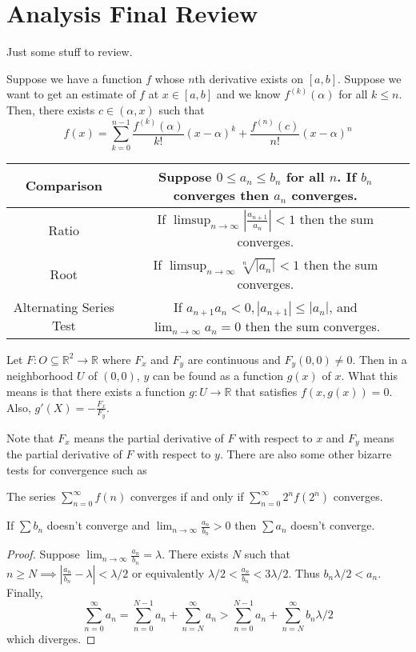 \documentclass{article}
\newcommand{\R}{\mathbb{R}}
\newcommand{\ra}[1][]{\xrightarrow{#1}}
\begin{document}
\section{Analysis Final Review}
Just some stuff to review.
\begin{theorem}
  Suppose we have a function $f$ whose $n$th derivative exists on $[a,b]$. Suppose we want to get an estimate of $f$ at $x\in[a,b]$ and we know $f^{(k)}(\alpha)$ for all $k\leq n$. Then, there exists $c\in(\alpha,x)$ such that
  $$f(x)=\sum_{k=0}^{n-1}\frac{f^{(k)}(\alpha)}{k!}(x-\alpha)^k+\frac{f^{(n)}(c)}{n!}(x-\alpha)^n$$
\end{theorem}
\begin{tabular}{|c|c|}
\hline
Comparison & Suppose $0\leq a_n\leq b_n$ for all $n$. If $b_n$ converges then $a_n$ converges. \\
\hline
Ratio & If $\limsup_{n\ra\infty}|\frac{a_{n+1}}{a_n}|<1$ then the sum converges.\\
\hline
Root & If $\limsup_{n\ra\infty}\sqrt[n]{|a_n|}<1$ then the sum converges.\\
\hline
Alternating Series Test & If $a_{n+1}a_n<0,|a_{n+1}|\leq|a_n|$, and $\lim_{n\ra\infty}a_n=0$ then the sum converges. \\
\hline
\end{tabular}
\begin{theorem}
Let $F:O\subseteq \R^2\ra\R$ where $F_x$ and $F_y$ are continuous and $F_y(0,0)\neq 0$. Then in a neighborhood $U$ of $(0,0)$, $y$ can be found as a function $g(x)$ of $x$. What this means is that there exists a function $g:U\ra \R$ that satisfies $f(x,g(x))=0$. Also, $g'(X)=-\frac{F_x}{F_y}$.
\end{theorem}
Note that $F_x$ means the partial derivative of $F$ with respect to $x$ and $F_y$ means the partial derivative of $F$ with respect to $y$. There are also some other bizarre tests for convergence such as
\begin{theorem}
  The series $\sum_{n=0}^\infty f(n)$ converges if and only if $\sum_{n=0}^\infty 2^nf(2^n)$ converges.
\end{theorem}
\begin{theorem}
  If $\sum b_n$ doesn't converge and $\lim_{n\to\infty}\frac{a_n}{b_n}>0$ then $\sum a_n$ doesn't converge.
\end{theorem}
\begin{proof}
  Suppose $\lim_{n\to\infty}\frac{a_n}{b_n}=\lambda$. There exists $N$ such that $n\geq N\implies |\frac{a_n}{b_n}-\lambda|<\lambda/2$ or equivalently $\lambda/2<\frac{a_n}{b_n}<3\lambda/2$. Thus $b_n\lambda/2<a_n$. Finally,
  $$\sum_{n=0}^\infty a_n=\sum_{n=0}^{N-1}a_n+\sum_{n=N}^\infty a_n>\sum_{n=0}^{N-1}a_n+\sum_{n=N}^\infty b_n\lambda/2$$ which diverges.
\end{proof}
\end{document}
